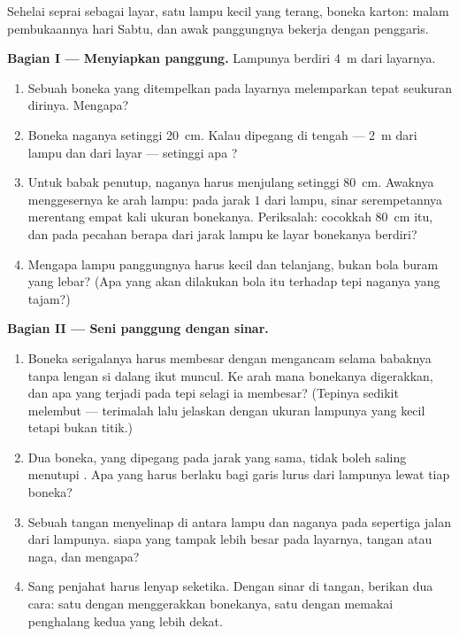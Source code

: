 \begin{problem}\label{pb:g6:light-propagation:1}
Sehelai seprai sebagai layar, satu lampu kecil yang terang, boneka
karton: malam pembukaannya hari Sabtu, dan awak panggungnya bekerja
dengan penggaris.

\medskip\noindent\textbf{Bagian I --- Menyiapkan panggung.}
Lampunya berdiri \qty{4}{m} dari layarnya.
\begin{enumerate}
  \item Sebuah boneka yang ditempelkan pada layarnya melemparkan
         tepat seukuran dirinya. Mengapa?
  \item Boneka naganya setinggi \qty{20}{cm}. Kalau dipegang di
        tengah --- \qty{2}{m} dari lampu dan dari layar --- setinggi
        apa ?
  \item Untuk babak penutup, naganya harus menjulang setinggi
        \qty{80}{cm}. Awaknya menggesernya ke arah lampu: pada jarak
        $1$  dari lampu, sinar serempetannya merentang empat
        kali ukuran bonekanya. Periksalah: cocokkah \qty{80}{cm}
        itu, dan pada pecahan berapa dari jarak lampu ke layar
        bonekanya berdiri?
  \item Mengapa lampu panggungnya harus kecil dan telanjang, bukan
        bola buram yang lebar? (Apa yang akan dilakukan bola itu
        terhadap tepi naganya yang tajam?)
\end{enumerate}

\medskip\noindent\textbf{Bagian II --- Seni panggung dengan sinar.}
\begin{enumerate}[resume]
  \item Boneka serigalanya harus membesar dengan mengancam selama
        babaknya tanpa lengan si dalang ikut muncul. Ke arah mana
        bonekanya digerakkan, dan apa yang terjadi pada tepi
         selagi ia membesar? (Tepinya sedikit
        melembut --- terimalah lalu jelaskan dengan ukuran lampunya
        yang kecil tetapi bukan titik.)
  \item Dua boneka, yang dipegang pada jarak yang sama, tidak boleh
        saling menutupi . Apa yang harus berlaku
        bagi garis lurus dari lampunya lewat tiap boneka?
  \item Sebuah tangan menyelinap di antara lampu dan naganya pada
        sepertiga jalan dari lampunya.  siapa yang
        tampak lebih besar pada layarnya, tangan atau naga, dan
        mengapa?
  \item Sang penjahat harus lenyap seketika. Dengan sinar di tangan,
        berikan dua cara: satu dengan menggerakkan bonekanya, satu
        dengan memakai penghalang kedua yang lebih dekat.
\end{enumerate}


\end{problem}
